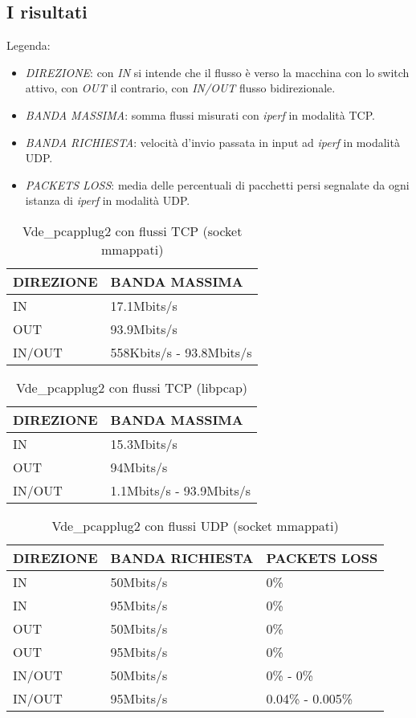 \subsection{I risultati}
Legenda:
\begin{itemize}
\item {\em DIREZIONE}: con {\em IN} si intende che il flusso è verso la macchina con lo switch attivo, con {\em OUT} il contrario, con {\em IN/OUT} flusso bidirezionale.
\item {\em BANDA MASSIMA}: somma flussi misurati con {\em iperf} in modalità TCP.
\item {\em BANDA RICHIESTA}: velocità d'invio passata in input ad {\em iperf} in modalità UDP.
\item {\em PACKETS LOSS}: media delle percentuali di pacchetti persi segnalate da ogni istanza di {\em iperf} in modalità UDP.
\end{itemize}
\begin{table}[h]
\begin{tabular}{|p{}|p{}|}
\hline
DIREZIONE    & BANDA MASSIMA       \\
\hline
\hline
IN       &   17.1Mbits/s       \\
\hline
OUT       &   93.9Mbits/s       \\
\hline
IN/OUT      & 558Kbits/s - 93.8Mbits/s   \\
\hline
\end{tabular}
\caption{Vde\_pcapplug2 con flussi TCP (socket mmappati)}
\label{pcapplugtcp}
\end{table}
\begin{table}[h]
\begin{tabular}{|p{}|p{}|}
\hline
DIREZIONE    & BANDA MASSIMA       \\
\hline
\hline
IN       &   15.3Mbits/s       \\
\hline
OUT       &   94Mbits/s       \\
\hline
IN/OUT      & 1.1Mbits/s - 93.9Mbits/s   \\
\hline
\end{tabular}
\caption{Vde\_pcapplug2 con flussi TCP (libpcap)}
\label{pcapplugtcpx}
\end{table}
\begin{table}[h]
\begin{tabular}{|p{}|p{}|p{}|}
\hline
DIREZIONE    & BANDA RICHIESTA   &  PACKETS LOSS   \\
\hline
\hline
IN       & 50Mbits/s  &  0\%   \\
\hline
IN       & 95Mbits/s  &  0\%   \\
\hline
OUT      & 50Mbits/s  &  0\%  \\
\hline
OUT      & 95Mbits/s  &  0\%  \\
\hline
IN/OUT   & 50Mbits/s  &  0\% - 0\%   \\
\hline
IN/OUT   & 95Mbits/s  &  0.04\% - 0.005\%   \\
\hline
\end{tabular}
\caption{Vde\_pcapplug2 con flussi UDP (socket mmappati)}
\label{pcapplugudp}
\end{table}
